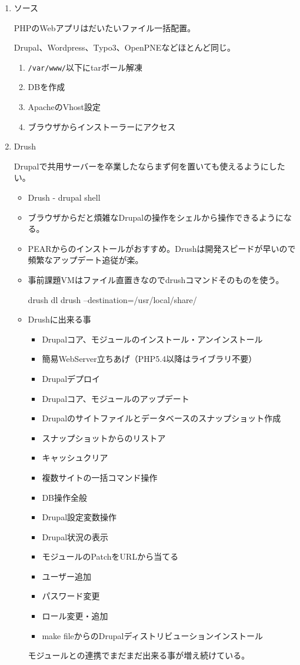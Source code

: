 \documentclass[mingoth,a4paper]{jsarticle}
\begin{document}
\begin{enumerate}
\item ソース

PHPのWebアプリはだいたいファイル一括配置。

Drupal、Wordpress、Typo3、OpenPNEなどほとんど同じ。
\begin{enumerate}
\item {\tt /var/www/}以下にtarボール解凍
\item DBを作成
\item ApacheのVhost設定
\item ブラウザからインストーラーにアクセス
\end{enumerate}

\item Drush

Drupalで共用サーバーを卒業したならまず何を置いても使えるようにしたい。
\begin{itemize}
\item Drush - drupal shell\cite{drush}
\item ブラウザからだと煩雑なDrupalの操作をシェルから操作できるようになる。
\item PEARからのインストールがおすすめ。Drushは開発スピードが早いので頻繁なアップデート追従が楽。
\item 事前課題VMはファイル直置きなのでdrushコマンドそのものを使う。

\begin{commandline}
drush dl drush --destination=/usr/local/share/
\end{commandline}

\clearpage

\item Drushに出来る事
  \begin{itemize}
  \item Drupalコア、モジュールのインストール・アンインストール
  \item 簡易WebServer立ちあげ（PHP5.4以降はライブラリ不要）
  \item Drupalデプロイ
  \item Drupalコア、モジュールのアップデート
  \item Drupalのサイトファイルとデータベースのスナップショット作成
  \item スナップショットからのリストア
  \item キャッシュクリア
  \item 複数サイトの一括コマンド操作
  \item DB操作全般
  \item Drupal設定変数操作
  \item Drupal状況の表示
  \item モジュールのPatchをURLから当てる
  \item ユーザー追加
  \item パスワード変更
  \item ロール変更・追加
  \item make fileからのDrupalディストリビューションインストール
  \end{itemize}

  モジュールとの連携でまだまだ出来る事が増え続けている。
\end{itemize}
\end{enumerate}
\end{document}
